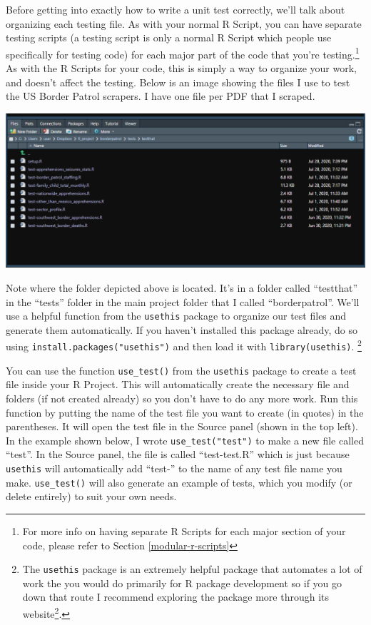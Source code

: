\documentclass[
]{krantz}
\renewcommand{\href}[2]{#2\footnote{\url{#1}}}
\begin{document}
Before getting into exactly how to write a unit test correctly, we'll talk about organizing each testing file. As with your normal R Script, you can have separate testing scripts (a testing script is only a normal R Script which people use specifically for testing code) for each major part of the code that you're testing.\footnote{For more info on having separate R Scripts for each major section of your code, please refer to Section \ref{modular-r-scripts}} As with the R Scripts for your code, this is simply a way to organize your work, and doesn't affect the testing. Below is an image showing the files I use to test the US Border Patrol scrapers. I have one file per PDF that I scraped.

\includegraphics{images/test_file_setup.PNG}

Note where the folder depicted above is located. It's in a folder called ``testthat'' in the ``tests'' folder in the main project folder that I called ``borderpatrol''. We'll use a helpful function from the \texttt{usethis} package to organize our test files and generate them automatically. If you haven't installed this package already, do so using \texttt{install.packages("usethis")} and then load it with \texttt{library(usethis)}. \footnote{The \texttt{usethis} package is an extremely helpful package that automates a lot of work the you would do primarily for R package development so if you go down that route I recommend exploring the package more through its \href{https://usethis.r-lib.org/index.html}{website}.}

You can use the function \texttt{use\_test()} from the \texttt{usethis} package to create a test file inside your R Project. This will automatically create the necessary file and folders (if not created already) so you don't have to do any more work. Run this function by putting the name of the test file you want to create (in quotes) in the parentheses. It will open the test file in the Source panel (shown in the top left). In the example shown below, I wrote \texttt{use\_test("test")} to make a new file called ``test''. In the Source panel, the file is called ``test-test.R'' which is just because \texttt{usethis} will automatically add ``test-'' to the name of any test file name you make. \texttt{use\_test()} will also generate an example of tests, which you modify (or delete entirely) to suit your own needs.
\end{document}
